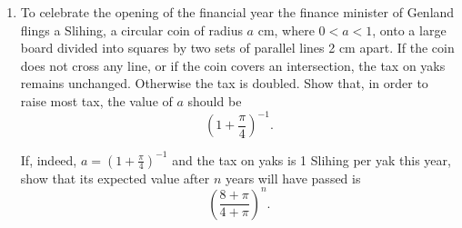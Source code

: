 \documentclass[a4, 11pt]{report}
\newlength{\qspace}
\newcounter{qnumber}
\newenvironment{question}%
 {\vspace{\qspace}
  \begin{enumerate}[\bfseries 1\quad][10]%
    \setcounter{enumi}{\value{qnumber}}%
    \item%
 }
{
  \end{enumerate}
  \filbreak
  \stepcounter{qnumber}
 }
\begin{document}
\begin{question}
To celebrate the opening of the financial year
the finance minister of Genland flings a Slihing, a circular
coin of radius $a$ cm, where $0<a<1$, onto a 
large board divided
into squares by two sets
of parallel lines 2 cm apart. If the coin does not
cross any line, or if the coin covers an intersection,
the tax on yaks remains unchanged. Otherwise
the tax is doubled. Show that, in order to raise most tax,
the value of $a$ should be
 \[\left(1+{\displaystyle \frac{\pi}{4}}\right)^{-1}.\]

If, indeed, $a=\left(1+{\displaystyle \frac{\pi}{4}}\right)^{-1}$
and 
the tax on yaks is 1 Slihing per yak this year, show that
its expected value after $n$ years will have passed is
\[ \left(\frac{8+\pi}{4+\pi}\right)^{n}.\]
\end{question}
	
\end{document}
